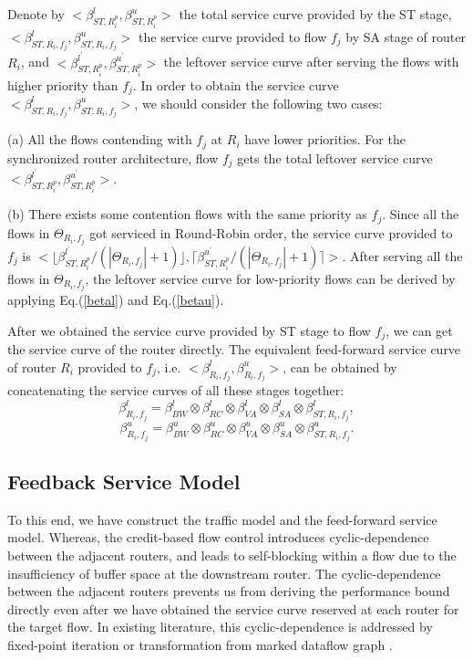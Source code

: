 \documentclass[10pt,journal]{IEEEtran}
\begin{document}
Denote by $<\beta_{ST,R_i^{p}}^l,\beta_{ST,R_i^{p}}^u>$ the total service curve provided by the ST stage, $<\beta_{ST,R_i,f_j}^l,\beta_{ST,R_i,f_j}^u>$ the service curve provided to flow $f_j$ by SA stage of router $R_i$, and $<\beta_{ST,R_i^{p}}^{l^\prime},\beta_{ST,R_i^{p}}^{u^\prime}>$ the leftover service curve after serving the flows with higher priority than $f_j$. In order to obtain the service curve $<\beta_{ST,R_i,f_j}^l,\beta_{ST,R_i,f_j}^u>$, we should consider the following two cases:

(a) All the flows contending with $f_j$ at $R_i$ have lower priorities. For the synchronized router architecture, flow $f_j$ gets the total leftover service curve $<\beta_{ST,R_i^{p}}^{l^\prime},\beta_{ST,R_i^{p}}^{u^\prime}>$.

(b) There exists some contention flows with the same priority as $f_j$. Since all the flows in $\Theta_{R_i,f_j}$ got serviced in Round-Robin order, the service curve provided to $f_j$ is $<\lfloor\beta^{l^\prime}_{ST,R_i^{p}}/(|\Theta_{R_i,f_j}|+1)\rfloor,\lceil\beta^{u^\prime}_{ST,R_i^{p}}/(|\Theta_{R_i,f_j}|+1)\rceil>$. After serving all the flows in $\Theta_{R_i,f_j}$, the leftover service curve for low-priority flows can be derived by applying Eq.(\ref{betal}) and Eq.(\ref{betau}).

After we obtained the service curve provided by ST stage to flow $f_j$, we can get the service curve of the router directly. The equivalent feed-forward service curve of router $R_i$ provided to $f_j$, i.e. $<\beta_{R_i,f_j}^l,\beta_{R_i,f_j}^u>$, can be obtained by concatenating the service curves of all these stages together:
$$\beta_{R_i,f_j}^l=\beta_{BW}^l\otimes\beta_{RC}^l\otimes\beta_{VA}^l\otimes\beta_{SA}^l\otimes \beta_{ST,R_i,f_j}^l,$$
$$\beta_{R_i,f_j}^u=\beta_{BW}^u\otimes\beta_{RC}^u\otimes\beta_{VA}^u\otimes\beta_{SA}^u\otimes \beta_{ST,R_i,f_j}^u.$$

\subsection{Feedback Service Model}\label{flowcontrol}
To this end, we have construct the traffic model and the feed-forward service model. Whereas, the credit-based flow control introduces cyclic-dependence between the adjacent routers, and leads to self-blocking within a flow due to the insufficiency of buffer space at the downstream router. The cyclic-dependence between the adjacent routers prevents us from deriving the performance bound directly even after we have obtained the service curve reserved at each router for the target flow. In existing literature, this cyclic-dependence is addressed by fixed-point iteration \cite{schioler2005network} or transformation from marked dataflow graph \cite{Thiele:2009:MPA:1629335.1629353}.
\end{document}
